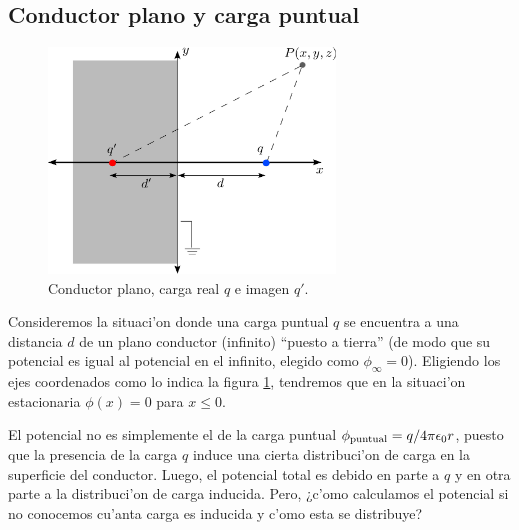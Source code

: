 \subsection{Conductor plano y carga puntual}
\begin{figure}[!h]
\centerline{\includegraphics[height=6cm]{fig/fig-carga-imagen-01.pdf}}
\caption{Conductor plano, carga real $q$ e imagen $q'$.}
\label{ci01}
\end{figure}
Consideremos la situaci'on donde una carga puntual $q$ se encuentra a una distancia $d$ de un plano conductor (infinito) ``puesto a tierra'' (de modo que su potencial es igual al potencial en el infinito, elegido como $\phi_\infty=0$). Eligiendo los ejes coordenados como lo indica la figura \ref{ci01}, tendremos que en la situaci'on estacionaria $\phi(x)=0$ para $x\le 0$. 

El potencial no es simplemente el de la carga puntual $\phi_{\rm puntual} = {q}/{4\pi\epsilon_0 r}$, puesto que la presencia de la carga $q$ induce una cierta distribuci'on de carga en la superficie del conductor. Luego, el potencial total es debido en parte a $q$ y en otra parte a la distribuci'on de carga inducida. Pero, ¿c'omo calculamos el potencial si no conocemos cu'anta carga es inducida y c'omo esta se distribuye? 

